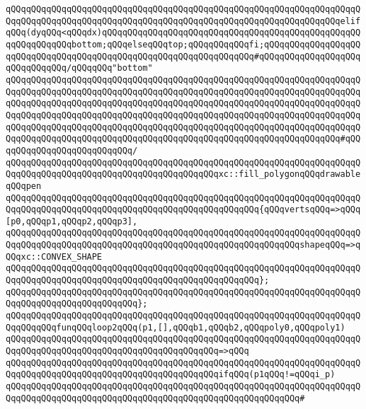 \verb|qQQqqQQqqQQqqQQqqQQqqQQqqQQqqQQqqQQqqQQqqQQqqQQqqQQqqQQqqQQqqQQqqQQqqQQqqQQqqQQqqQQqqQQqqQQqqQQqqQQqqQQqqQQqqQQqqQQqqQQqqQQqqQQqqQQqqQQqelifqQQq(dyqQQq<qQQqdx)qQQqqQQqqQQqqQQqqQQqqQQqqQQqqQQqqQQqqQQqqQQqqQQqqQQqqQQqqQQqqQQqbottom;qQQqelseqQQqtop;qQQqqQQqqQQqfi;qQQqqQQqqQQqqQQqqQQqqQQqqQQqqQQqqQQqqQQqqQQqqQQqqQQqqQQqqQQqqQQqqQQq#qQQqqQQqqQQqqQQqqQQqqQQqqQQqqQQq/qQQqqQQq"bottom"|\newline
\verb|qQQqqQQqqQQqqQQqqQQqqQQqqQQqqQQqqQQqqQQqqQQqqQQqqQQqqQQqqQQqqQQqqQQqqQQqqQQqqQQqqQQqqQQqqQQqqQQqqQQqqQQqqQQqqQQqqQQqqQQqqQQqqQQqqQQqqQQqqQQqqQQqqQQqqQQqqQQqqQQqqQQqqQQqqQQqqQQqqQQqqQQqqQQqqQQqqQQqqQQqqQQqqQQqqQQqqQQqqQQqqQQqqQQqqQQqqQQqqQQqqQQqqQQqqQQqqQQqqQQqqQQqqQQqqQQqqQQqqQQqqQQqqQQqqQQqqQQqqQQqqQQqqQQqqQQqqQQqqQQqqQQqqQQqqQQqqQQqqQQqqQQqqQQqqQQqqQQqqQQqqQQqqQQqqQQqqQQqqQQqqQQqqQQqqQQqqQQqqQQqqQQqqQQqqQQqqQQq#qQQqqQQqqQQqqQQqqQQqqQQqqQQq/|\newline
\verb|qQQqqQQqqQQqqQQqqQQqqQQqqQQqqQQqqQQqqQQqqQQqqQQqqQQqqQQqqQQqqQQqqQQqqQQqqQQqqQQqqQQqqQQqqQQqqQQqqQQqqQQqqQQqqQQqxc::fill_polygonqQQqdrawableqQQqpen|\newline
\verb|qQQqqQQqqQQqqQQqqQQqqQQqqQQqqQQqqQQqqQQqqQQqqQQqqQQqqQQqqQQqqQQqqQQqqQQqqQQqqQQqqQQqqQQqqQQqqQQqqQQqqQQqqQQqqQQqqQQqqQQq{qQQqvertsqQQq=>qQQq[p0,qQQqp1,qQQqp2,qQQqp3],|\newline
\verb|qQQqqQQqqQQqqQQqqQQqqQQqqQQqqQQqqQQqqQQqqQQqqQQqqQQqqQQqqQQqqQQqqQQqqQQqqQQqqQQqqQQqqQQqqQQqqQQqqQQqqQQqqQQqqQQqqQQqqQQqqQQqqQQqshapeqQQq=>qQQqxc::CONVEX_SHAPE|\newline
\verb|qQQqqQQqqQQqqQQqqQQqqQQqqQQqqQQqqQQqqQQqqQQqqQQqqQQqqQQqqQQqqQQqqQQqqQQqqQQqqQQqqQQqqQQqqQQqqQQqqQQqqQQqqQQqqQQqqQQqqQQq};|\newline
\verb|qQQqqQQqqQQqqQQqqQQqqQQqqQQqqQQqqQQqqQQqqQQqqQQqqQQqqQQqqQQqqQQqqQQqqQQqqQQqqQQqqQQqqQQqqQQqqQQq};|\newline
\newline
\verb|qQQqqQQqqQQqqQQqqQQqqQQqqQQqqQQqqQQqqQQqqQQqqQQqqQQqqQQqqQQqqQQqqQQqqQQqqQQqqQQqfunqQQqloop2qQQq(p1,[],qQQqb1,qQQqb2,qQQqpoly0,qQQqpoly1)|\newline
\verb|qQQqqQQqqQQqqQQqqQQqqQQqqQQqqQQqqQQqqQQqqQQqqQQqqQQqqQQqqQQqqQQqqQQqqQQqqQQqqQQqqQQqqQQqqQQqqQQqqQQqqQQqqQQqqQQq=>qQQq|\newline
\verb|qQQqqQQqqQQqqQQqqQQqqQQqqQQqqQQqqQQqqQQqqQQqqQQqqQQqqQQqqQQqqQQqqQQqqQQqqQQqqQQqqQQqqQQqqQQqqQQqqQQqqQQqqQQqqQQqifqQQq(p1qQQq!=qQQqi_p)|\newline
\verb|qQQqqQQqqQQqqQQqqQQqqQQqqQQqqQQqqQQqqQQqqQQqqQQqqQQqqQQqqQQqqQQqqQQqqQQqqQQqqQQqqQQqqQQqqQQqqQQqqQQqqQQqqQQqqQQqqQQqqQQqqQQqqQQq#|\newline
